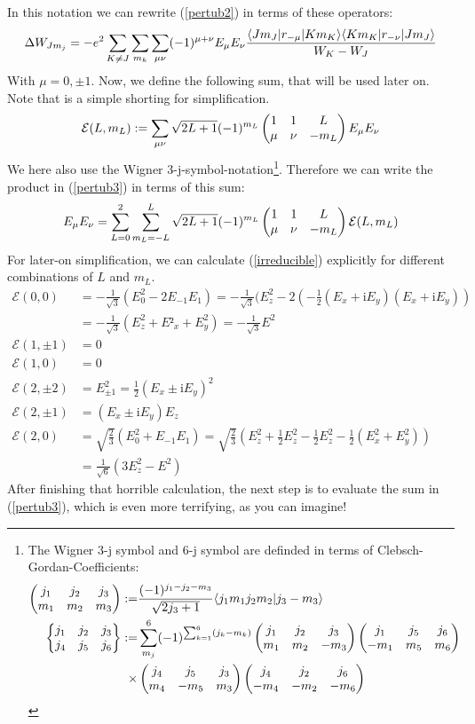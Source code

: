 In this notation we can rewrite (\ref{pertub2}) in terms of these operators:
\begin{equation}
\Delta W_{Jm_j}=-e^2\sum_{K\neq J}\sum_{m_k}\sum_{\mu\nu}(-1)^{\mu+\nu}E_\mu E_\nu\frac{\langle Jm_J| r_{-\mu} | Km_K\rangle\langle Km_K| r_{-\nu} | Jm_J\rangle}{W_K-W_J}\label{pertub3}
\end{equation}
With $\mu=0,\pm1$. Now, we define the following sum, that will be used later on. Note that is a simple shorting for simplification.
\begin{equation}
\mathcal{E}(L,m_L):=\sum_{\mu\nu}\sqrt{2L+1}(-1)^{m_L}\begin{pmatrix}1&1&L\\\mu&\nu&-m_L\end{pmatrix}E_\mu E_\nu\label{irreducible}
\end{equation}
We here also use the Wigner 3-j-symbol-notation\footnote{The Wigner 3-j symbol and 6-j symbol are definded in terms of Clebsch-Gordan-Coefficients:\begin{align}\begin{pmatrix}j_1&j_2&j_3\\m_1&m_2&m_3\end{pmatrix}:=&\frac{(-1)^{j_1-j_2-m_3}}{\sqrt{2j_3+1}}\langle j_1m_1j_2m_2 | j_3-m_3 \rangle\\\begin{Bmatrix}j_1&j_2&j_3\\j_4&j_5&j_6\end{Bmatrix}:=&\sum^6_{m_j}(-1)^{\sum^6_{k=1}(j_k-m_k)}\begin{pmatrix}j_1&j_2&j_3\\m_1&m_2&-m_3\end{pmatrix}\begin{pmatrix}j_1&j_5&j_6\\-m_1&m_5&m_6\end{pmatrix}\\\times&\begin{pmatrix}j_4&j_5&j_3\\m_4&-m_5&m_3\end{pmatrix}\begin{pmatrix}j_4&j_2&j_6\\-m_4&-m_2&-m_6\end{pmatrix}\label{jsymbols}\end{align}}. Therefore we can write the product in (\ref{pertub3}) in terms of this sum: 
\begin{equation}
E_\mu E_\nu=\sum^2_{L=0}\sum^L_{m_L=-L}\sqrt{2L+1}(-1)^{m_L}\begin{pmatrix}1&1&L\\\mu&\nu&-m_L\end{pmatrix}\mathcal{E}(L,m_L)
\end{equation}
For later-on simplification, we can calculate (\ref{irreducible}) explicitly for different combinations of $L$ and $m_L$.
\begin{align*}
\mathcal{E}(0,0)&=-\frac{1}{\sqrt{3}}(E^2_0-2E_{-1}E_{1})=-\frac{1}{\sqrt{3}}(E^2_z-2(-\frac{1}{2}(E_x+\mathrm{i}E_y)(E_x+\mathrm{i}E_y))\\&=-\frac{1}{\sqrt{3}}(E^2_z+E²_x+E^2_y)=-\frac{1}{\sqrt{3}}E^2\\
\mathcal{E}(1,\pm 1)&=0\\
\mathcal{E}(1,0)&=0\\
\mathcal{E}(2,\pm2)&=E^2_{\pm1}=\frac{1}{2}(E_x\pm \mathrm{i}E_y)^2\\
\mathcal{E}(2,\pm1)&=(E_x\pm \mathrm{i}E_y)E_z\\
\mathcal{E}(2,0)&=\sqrt{\frac{2}{3}}(E^2_0+E_{-1}E_1)=\sqrt{\frac{2}{3}}(E^2_z+\frac{1}{2}E^2_z-\frac{1}{2}E^2_z-\frac{1}{2}(E^2_x+E^2_y))\\&=\frac{1}{\sqrt{6}}(3E^2_z-E^2)
\end{align*}
After finishing that horrible calculation, the next step is to evaluate the sum in (\ref{pertub3}), which is even more terrifying, as you can imagine!

